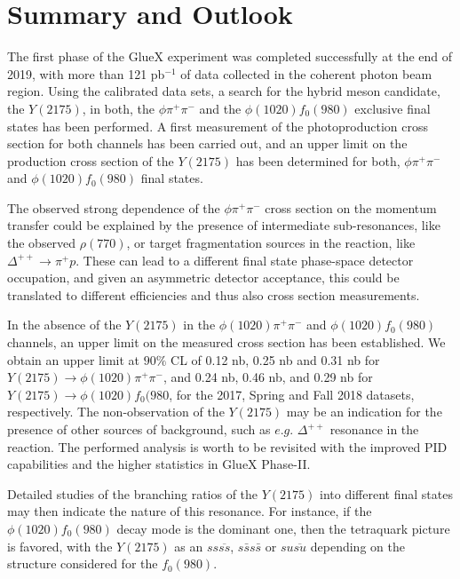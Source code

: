 \section{Summary and Outlook}
\label{sec.summ}

The first phase of the GlueX experiment was completed successfully at the end of 2019, with more than 121 pb$^{-1}$ of data collected in the coherent photon beam region. Using the calibrated data sets, a search for the hybrid meson candidate, the $Y(2175)$, in both, the $\phi\pi^{+}\pi^{-}$ and the $\phi(1020) f_0(980)$ exclusive final states has been performed. A first measurement of the photoproduction cross section for both channels has been carried out, and an upper limit on the production cross section of the $Y(2175)$ has been determined for both, $\phi\pi^{+}\pi^{-}$ and $\phi(1020)f_0(980)$ final states.
~\par The observed strong dependence of the $\phi \pi^+\pi^-$ cross section on the momentum transfer could be explained by the presence of intermediate sub-resonances, like the observed $\rho(770)$, or target fragmentation sources in the reaction, like $\Delta^{++} \rightarrow \pi^+ p$. These can lead to a different final state phase-space detector occupation, and given an asymmetric detector acceptance, this could be translated to different efficiencies and thus also cross section measurements.
~\par In the absence of the $Y(2175)$ in the $\phi(1020) \pi^+\pi^-$ and $\phi(1020) f_0(980)$ channels, an upper limit on the measured cross section has been established. We obtain an upper limit at $90\%$ CL of 0.12 nb, 0.25 nb and 0.31 nb for $Y(2175)\rightarrow \phi(1020) \pi^+\pi^-$, and 0.24 nb, 0.46 nb, and 0.29 nb for $Y(2175)\rightarrow \phi(1020) f_0(980$, for the 2017, Spring and Fall 2018 datasets, respectively. The non-observation of the $Y(2175)$ may be an indication for the presence of other sources of background, such as $e.g.$ $\Delta^{++}$ resonance in the reaction. The performed analysis is worth to be revisited with the improved PID capabilities and the higher statistics in GlueX Phase-II.
~\par Detailed studies of the branching ratios of the $Y(2175)$ into different final states may then indicate the nature of this resonance. For instance, if the $\phi(1020) f_0(980)$ decay mode is the dominant one, then the tetraquark picture is favored, with the $Y(2175)$ as an $ss\overline{ss}$, $s\bar{s}s\bar{s}$ or $su\overline{su}$ depending on the structure considered for the $f_0(980)$. 

